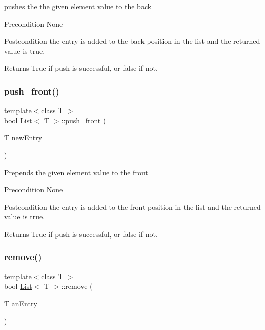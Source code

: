 pushes the the given element value to the back \begin{DoxyPrecond}{Precondition}
None 
\end{DoxyPrecond}
\begin{DoxyPostcond}{Postcondition}
the entry is added to the back position in the list and the returned value is true. 
\end{DoxyPostcond}
\begin{DoxyReturn}{Returns}
True if push is successful, or false if not. 
\end{DoxyReturn}
\mbox{\label{class_list_a7ad16a889175f6bbb32aeb295c8f30c3}} 
\subsubsection{\texorpdfstring{push\+\_\+front()}{push\_front()}}
{\footnotesize\ttfamily template$<$class T $>$ \\
bool \hyperlink{class_list}{List}$<$ T $>$\+::push\+\_\+front (\begin{DoxyParamCaption}\item[{T}]{new\+Entry }\end{DoxyParamCaption})}

Prepends the given element value to the front \begin{DoxyPrecond}{Precondition}
None 
\end{DoxyPrecond}
\begin{DoxyPostcond}{Postcondition}
the entry is added to the front position in the list and the returned value is true. 
\end{DoxyPostcond}
\begin{DoxyReturn}{Returns}
True if push is successful, or false if not. 
\end{DoxyReturn}
\mbox{\label{class_list_a91f71c17d25baa99323e99297695492f}} 
\subsubsection{\texorpdfstring{remove()}{remove()}}
{\footnotesize\ttfamily template$<$class T $>$ \\
bool \hyperlink{class_list}{List}$<$ T $>$\+::remove (\begin{DoxyParamCaption}\item[{T}]{an\+Entry }\end{DoxyParamCaption})}

